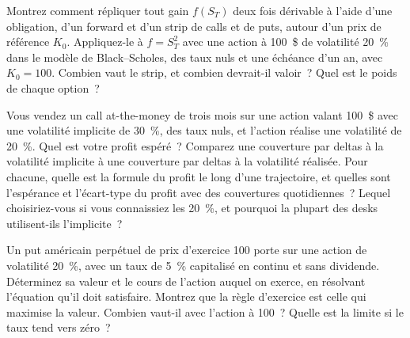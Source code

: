 \begin{question}\label{iq:iv2:options-parity-and-greeks:48}
Montrez comment répliquer tout gain $f(S_T)$ deux fois dérivable à l'aide d'une obligation, d'un forward et d'un strip de calls et de puts, autour d'un prix de référence $K_0$. Appliquez-le à $f = S_T^2$ avec une action à 100~\$ de volatilité 20~\% dans le modèle de Black--Scholes, des taux nuls et une échéance d'un an, avec $K_0 = 100$. Combien vaut le strip, et combien devrait-il valoir~? Quel est le poids de chaque option~?
\end{question}

\begin{question}\label{iq:iv2:options-parity-and-greeks:49}
Vous vendez un call at-the-money de trois mois sur une action valant 100~\$ avec une volatilité implicite de 30~\%, des taux nuls, et l'action réalise une volatilité de 20~\%. Quel est votre profit espéré~? Comparez une couverture par deltas à la volatilité implicite à une couverture par deltas à la volatilité réalisée. Pour chacune, quelle est la formule du profit le long d'une trajectoire, et quelles sont l'espérance et l'écart-type du profit avec des couvertures quotidiennes~? Lequel choisiriez-vous si vous connaissiez les 20~\%, et pourquoi la plupart des desks utilisent-ils l'implicite~?
\end{question}

\begin{question}\label{iq:iv2:options-parity-and-greeks:50}
Un put américain perpétuel de prix d'exercice 100 porte sur une action de volatilité 20~\%, avec un taux de 5~\% capitalisé en continu et sans dividende. Déterminez sa valeur et le cours de l'action auquel on exerce, en résolvant l'équation qu'il doit satisfaire. Montrez que la règle d'exercice est celle qui maximise la valeur. Combien vaut-il avec l'action à 100~? Quelle est la limite si le taux tend vers zéro~?
\end{question}
